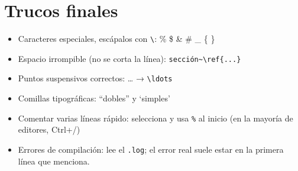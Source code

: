 \section{Trucos finales}
\begin{itemize}
  \item Caracteres especiales, escápalos con \texttt{\textbackslash}:
        \% \$ \& \# \_ \{ \}
  \item Espacio irrompible (no se corta la línea): \texttt{sección\textasciitilde\textbackslash ref\{...\}}
  \item Puntos suspensivos correctos: \ldots{} → \texttt{\textbackslash ldots}
  \item Comillas tipográficas: ``dobles'' y `simples'
  \item Comentar varias líneas rápido: selecciona y usa \texttt{\%} al inicio
        (en la mayoría de editores, Ctrl+/)
  \item Errores de compilación: lee el \texttt{.log}; el error real suele
        estar en la primera línea que menciona.
\end{itemize}


